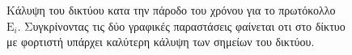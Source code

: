 \begin{figure}[H]
  \centering
  \caption{Κάλυψη του δικτύου κατα την πάροδο του χρόνου για το πρωτόκολλο $\text{E}_{i}$. Συγκρίνοντας τις δύο γραφικές παραστάσεις φαίνεται οτι στο δίκτυο με
φορτιστή
υπάρχει καλύτερη κάλυψη των σημείων του δικτύου.}
  \label{fig:1exp_3_3}
\end{figure}





